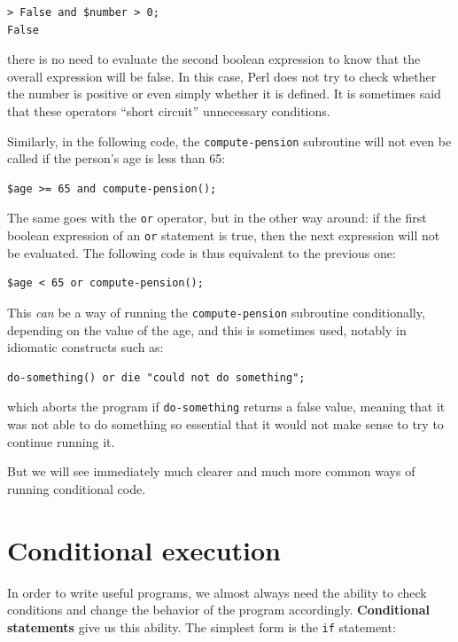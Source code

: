 \begin{verbatim}
> False and $number > 0;
False
\end{verbatim}
%
there is no need to evaluate the second boolean expression 
to know that the overall expression will be false. In this case, 
Perl does not try to check whether the number is positive or 
even simply whether it is defined. It is sometimes said that 
these operators ``short circuit'' unnecessary conditions.

Similarly, in the following code, the {\tt compute-pension} 
subroutine will not even be called if the person's age is 
less than 65:

\begin{verbatim}
$age >= 65 and compute-pension();
\end{verbatim}
%
The same goes with the {\tt or} operator, but in the other way 
around: if the first boolean expression of an {\tt or} 
statement is true, then the next expression will not be 
evaluated. The following code is thus equivalent to the previous 
one:

\begin{verbatim}
$age < 65 or compute-pension();
\end{verbatim}
% 
This \emph{can} be a way of running the {\tt compute-pension} 
subroutine conditionally, depending on the value of the age, and 
this is sometimes used, notably in idiomatic constructs such as:

\begin{verbatim}
do-something() or die "could not do something";
\end{verbatim}
%
which aborts the program if {\tt do-something} returns a false 
value, meaning that it was not able to do something 
so essential that it would not make sense to try to continue 
running it.

But we will see immediately much clearer and much more common 
ways of running conditional code.


\section{Conditional execution}
\label{conditional.execution}

In order to write useful programs, we almost always need the ability
to check conditions and change the behavior of the program
accordingly.  {\bf Conditional statements} give us this ability.  The
simplest form is the {\tt if} statement:

